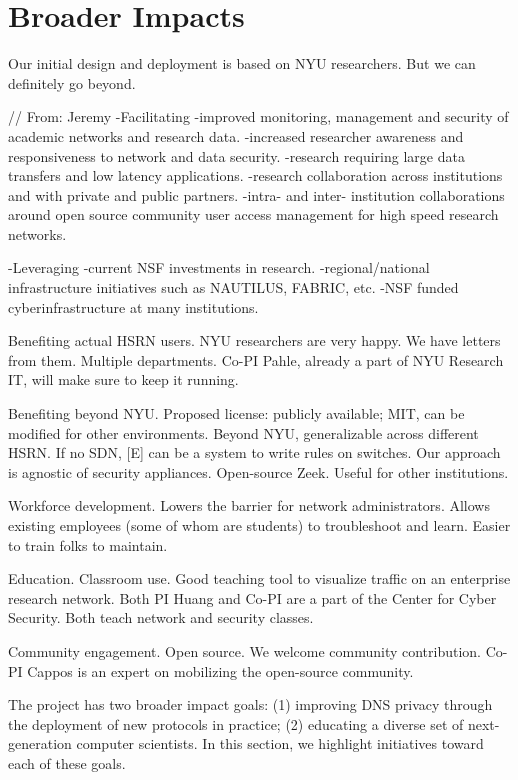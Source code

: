\section{Broader Impacts}\label{sec:impacts}


Our initial design and deployment is based on NYU researchers. But we can definitely go beyond.

// From: Jeremy
-Facilitating
-improved monitoring, management and security of academic networks and research
data.
-increased researcher awareness and responsiveness to network and data security.
-research requiring large data transfers and low latency applications.
-research collaboration across institutions and with private and public partners.
-intra- and inter- institution collaborations around open source community user access
management for high speed research networks.

-Leveraging
-current NSF investments in research.
-regional/national infrastructure initiatives such as NAUTILUS, FABRIC, etc.
-NSF funded cyberinfrastructure at many institutions.

Benefiting actual HSRN users. NYU researchers are very happy. We have letters from them. Multiple departments. Co-PI Pahle, already a part of NYU Research IT, will make sure to keep it running.

Benefiting beyond NYU. Proposed license: publicly available; MIT, can be modified for other environments. Beyond NYU, generalizable across different HSRN. If no SDN, [E] can be a system to write rules on switches. Our approach is agnostic of security appliances. Open-source Zeek. Useful for other institutions.

Workforce development. Lowers the barrier for network administrators. Allows existing employees (some of whom are students) to troubleshoot and learn. Easier to train folks to maintain.

Education. Classroom use. Good teaching tool to visualize traffic on an enterprise research network. Both PI Huang and Co-PI are a part of the Center for Cyber Security. Both teach network and security classes.

Community engagement. Open source. We welcome community contribution. Co-PI Cappos is an expert on mobilizing the open-source community.




The project has two broader impact goals: (1) improving DNS privacy through
the deployment of new protocols in practice; (2) educating a diverse set of
next-generation computer scientists. In this section, we highlight
initiatives toward each of these goals.

